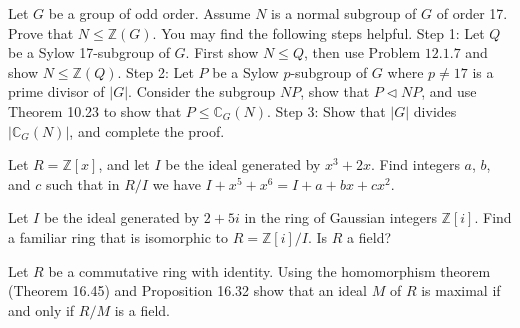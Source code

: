 \documentclass[12pt,letterpaper,boxed]{hmcpset}
\begin{document}

\begin{problem}[12.3.22]
Let $G$ be a group of odd order. Assume $N$ is a normal subgroup of $G$ of order 17. Prove that $N \leq \mathbb{Z}(G)$.
\newline You may find the following steps helpful.
\newline
Step 1: Let $Q$ be a Sylow 17-subgroup of $G$. First show $N \leq Q$, then use Problem $\textit{12.1.7}$ and show $N \leq \mathbb{Z}(Q)$.
\newline
Step 2: Let $P$ be a Sylow $p$-subgroup of $G$ where $p \neq 17$ is a prime divisor of $\vert G \vert$. Consider the subgroup $NP$, show that $P \triangleleft NP$, and use Theorem 10.23 to show that $P \leq \mathbb{C}_G(N)$.
\newline
Step 3: Show that $\vert G \vert$ divides $\vert \mathbb{C}_G(N) \vert$, and complete the proof.
\end{problem}

\begin{solution}
\end{solution}

\clearpage

\begin{problem}[16.2.4]
Let $R = \mathbb{Z}[x]$, and let $I$ be the ideal generated by $x^3 + 2x$. Find integers $a$, $b$, and $c$ such that in $R/I$ we have $I + x^5 + x^6 = I + a + bx + cx^2$.
\end{problem}

\begin{solution}
\end{solution}

\clearpage

\begin{problem}[16.2.8]
Let $I$ be the ideal generated by $2+5i$ in the ring of Gaussian integers $\mathbb{Z}[i]$. Find a familiar ring that is isomorphic to $R = \mathbb{Z}[i]/I$. Is $R$ a field?
\end{problem}

\begin{solution}
\end{solution}

\clearpage

\begin{problem}[16.2.9]
Let $R$ be a commutative ring with identity. Using the homomorphism theorem (Theorem 16.45) and Proposition 16.32 show that an ideal $M$ of $R$ is maximal if and only if $R/M$ is a field. 
\end{problem}
\end{document}
